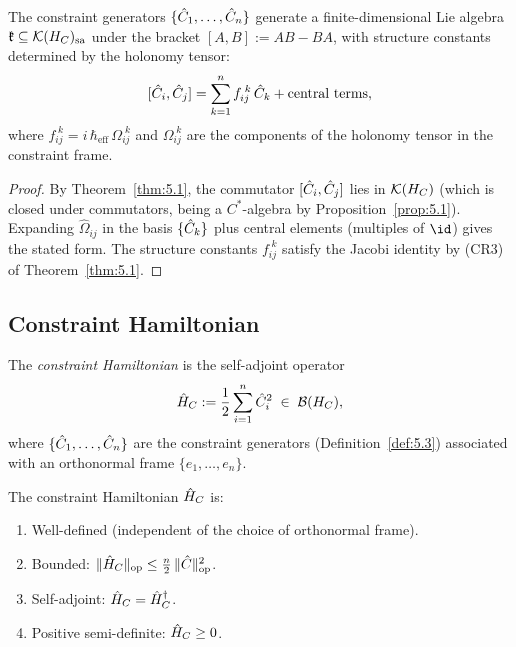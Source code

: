 \begin{corollary}
\label{cor:5.1}
The constraint generators $\{\hat{C}_1, \ldots, \hat{C}_n\}$ generate a
finite-dimensional Lie algebra
$\mathfrak{k} \subseteq \mathcal{K}(H_C)_{\mathrm{sa}}$ under the bracket
$[A, B] := AB - BA$, with structure constants determined by the
holonomy tensor:
\[
  [\hat{C}_i, \hat{C}_j] = \sum_{k=1}^{n} f_{ij}^{\;k}\, \hat{C}_k
  + \text{central terms},
\]
where $f_{ij}^{\;k} = i\,\hbar_{\mathrm{eff}}\,
\Omega_{ij}^{\;k}$ and $\Omega_{ij}^{\;k}$ are the components of the
holonomy tensor in the constraint frame.
\end{corollary}

\begin{proof}
By Theorem~\ref{thm:5.1}, the commutator $[\hat{C}_i, \hat{C}_j]$ lies in
$\mathcal{K}(H_C)$ (which is closed under commutators, being a $C^*$-algebra by
Proposition~\ref{prop:5.1}).  Expanding $\hat\Omega_{ij}$ in the basis
$\{\hat{C}_k\}$ plus central elements (multiples of $\id$) gives the
stated form.  The structure constants $f_{ij}^{\;k}$ satisfy the Jacobi
identity by (CR3) of Theorem~\ref{thm:5.1}.
\end{proof}

\subsection{Constraint Hamiltonian}
\label{sec:ch5:hamiltonian}

\begin{definition}
\label{def:5.7}
The \emph{constraint Hamiltonian} is the self-adjoint operator
\[
  \hat{H}_C := \frac{1}{2} \sum_{i=1}^{n} \hat{C}_i^2 \;\in\; \mathcal{B}(H_C),
\]
where $\{\hat{C}_1, \ldots, \hat{C}_n\}$ are the constraint generators
\textup{(}Definition~\textup{\ref{def:5.3})} associated with an
orthonormal frame $\{e_1, \ldots, e_n\}$.
\end{definition}

\begin{lemma}
\label{lem:5.4}
The constraint Hamiltonian $\hat{H}_C$ is:
\begin{enumerate}
  \item[\textup{(i)}] Well-defined \textup{(}independent of the choice
    of orthonormal frame\textup{)}.
  \item[\textup{(ii)}] Bounded:
    $\|\hat{H}_C\|_{\mathrm{op}} \leq \frac{n}{2}\,
    \|\hat{C}\|_{\mathrm{op}}^2$.
  \item[\textup{(iii)}] Self-adjoint: $\hat{H}_C = \hat{H}_C^\dagger$.
  \item[\textup{(iv)}] Positive semi-definite: $\hat{H}_C \geq 0$.
\end{enumerate}
\end{lemma}

